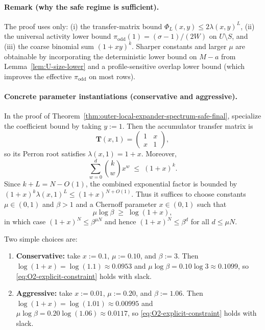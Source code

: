 \paragraph{Remark (why the safe regime is sufficient).}
The proof uses only:
(i) the transfer-matrix bound $\Phi_L(x,y)\le 2\lambda(x,y)^L$,
(ii) the universal activity lower bound $\pi_{\mathrm{odd}}(1)=(\sigma-1)/(2W)$ on $U\setminus S$, and
(iii) the coarse binomial sum $(1+xy)^k$.
Sharper constants and larger $\mu$ are obtainable by incorporating the deterministic lower bound on $M-a$ from
Lemma~\ref{lem:U-size-lower} and a profile-sensitive overlap lower bound (which improves the effective $\pi_{\mathrm{odd}}$
on most rows).

%

\paragraph{Concrete parameter instantiations (conservative and aggressive).}
In the proof of Theorem~\ref{thm:outer-local-expander-spectrum-safe-final}, specialize the coefficient bound by taking
$y:=1$.
Then the accumulator transfer matrix is
\[
\mathbf T(x,1)=\begin{pmatrix}1&x\\ x&1\end{pmatrix},
\]
so its Perron root satisfies $\lambda(x,1)=1+x$.
Moreover,
\[
\sum_{w=0}^{d}\binom{k}{w}x^{w}\;\le\;(1+x)^{k}.
\]
Since $k+L=N-O(1)$, the combined exponential factor is bounded by $(1+x)^{k}\lambda(x,1)^{L}\le (1+x)^{N+O(1)}$.
Thus it suffices to choose constants $\mu\in(0,1)$ and $\beta>1$ and a Chernoff parameter $x\in(0,1)$ such that
\begin{equation}
\mu\log \beta \;\ge\; \log(1+x),
\label{eq:O2-explicit-constraint}
\end{equation}
in which case $(1+x)^{N}\le \beta^{\mu N}$ and hence $(1+x)^{N}\le \beta^{d}$ for all $d\le \mu N$.

Two simple choices are:

\begin{enumerate}
\item \textbf{Conservative:} take $x:=0.1$, $\mu:=0.10$, and $\beta:=3$.
      Then $\log(1+x)=\log(1.1)\approx 0.0953$ and $\mu\log\beta=0.10\log 3\approx 0.1099$, so
      \eqref{eq:O2-explicit-constraint} holds with slack.

\item \textbf{Aggressive:} take $x:=0.01$, $\mu:=0.20$, and $\beta:=1.06$.
      Then $\log(1+x)=\log(1.01)\approx 0.00995$ and $\mu\log\beta=0.20\log(1.06)\approx 0.0117$, so
      \eqref{eq:O2-explicit-constraint} holds with slack.
\end{enumerate}

